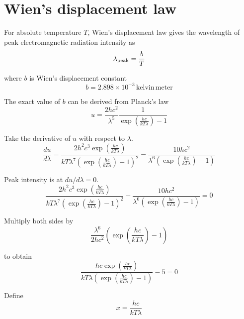 

\section*{Wien's displacement law}

For absolute temperature $T$,
Wien's displacement law gives the wavelength
of peak electromagnetic radiation intensity as
\begin{equation*}
\lambda_{\rm peak}=\frac{b}{T}
\end{equation*}

where $b$ is Wien's displacement constant
\begin{equation*}
b=2.898\times10^{-3}\,\text{kelvin}\,\text{meter}
\end{equation*}

The exact value of $b$ can be derived from Planck's law
\begin{equation*}
u=\frac{2hc^2}{\lambda^5}\frac{1}{\exp\left(\frac{hc}{kT\lambda}\right)-1}
\end{equation*}

Take the derivative of $u$ with respect to $\lambda$.
\begin{equation*}
\frac{du}{d\lambda}
=\frac{2h^2c^3\exp\left(\frac{hc}{kT\lambda}\right)}
{kT\lambda^7\left(\exp\left(\frac{hc}{kT\lambda}\right)-1\right)^2}
-\frac{10hc^2}{\lambda^6\left(\exp\left(\frac{hc}{kT\lambda}\right)-1\right)}
\end{equation*}

Peak intensity is at $du/d\lambda=0$.
\begin{equation*}
\frac{2h^2c^3\exp\left(\frac{hc}{kT\lambda}\right)}
{kT\lambda^7\left(\exp\left(\frac{hc}{kT\lambda}\right)-1\right)^2}
-\frac{10hc^2}{\lambda^6\left(\exp\left(\frac{hc}{kT\lambda}\right)-1\right)}=0
\end{equation*}

Multiply both sides by
\begin{equation*}
\frac{\lambda^6}{2hc^2}\left(\exp\left(\frac{hc}{kT\lambda}\right)-1\right)
\end{equation*}

to obtain
\begin{equation*}
\frac{hc\exp\left(\frac{hc}{kT\lambda}\right)}
{kT\lambda\left(\exp\left(\frac{hc}{kT\lambda}\right)-1\right)}-5=0
\end{equation*}

Define
\begin{equation*}
x=\frac{hc}{kT\lambda}
\end{equation*}

